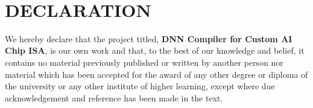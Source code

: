 \documentclass[12pt]{report}
\begin{document}
\begin{spacing}{1.01}
{        \vspace*{0.25cm}
        \\
        \vspace*{0.5cm}
    }
    \chapter*{DECLARATION}
    We hereby declare that the project titled, \textbf{DNN Compiler for Custom AI Chip ISA}, is our own work and that, to the best of our knowledge and belief, it contains no material previously published or written by another person nor material which has been accepted for the award of any other degree or diploma of the university or any other institute of higher learning, except where due acknowledgement and reference has been made in the text.\\

    \vspace{1.2cm}


    \noindent\begin{minipage}{\textwidth}
        \vspace{1.2cm}
    

\end{minipage}
\end{spacing}
\end{document}

